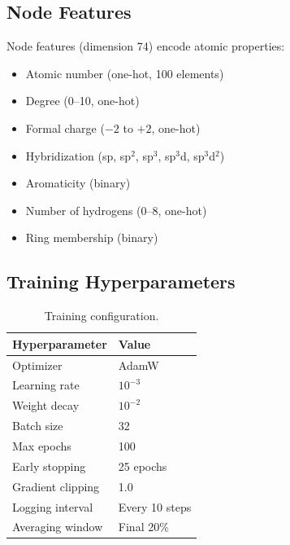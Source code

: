 \documentclass{article}
\begin{document}
\subsection{Node Features}
Node features (dimension 74) encode atomic properties:
\begin{itemize}[nosep,topsep=2pt]
    \item Atomic number (one-hot, 100 elements)
    \item Degree (0--10, one-hot)
    \item Formal charge ($-2$ to $+2$, one-hot)
    \item Hybridization (sp, sp$^2$, sp$^3$, sp$^3$d, sp$^3$d$^2$)
    \item Aromaticity (binary)
    \item Number of hydrogens (0--8, one-hot)
    \item Ring membership (binary)
\end{itemize}
\vspace{-1mm}
\subsection{Training Hyperparameters}
\vspace{-1mm}
\begin{table}[H]
\caption{Training configuration.}
\vspace{-1mm}
\begin{center}
\begin{tabular}{@{}ll@{}}
\toprule
Hyperparameter & Value \\
\midrule
Optimizer & AdamW \\
Learning rate & $10^{-3}$ \\
Weight decay & $10^{-2}$ \\
Batch size & 32 \\
Max epochs & 100 \\
Early stopping & 25 epochs \\
Gradient clipping & 1.0 \\
Logging interval & Every 10 steps \\
Averaging window & Final 20\% \\
\bottomrule
\end{tabular}
\end{center}
\vspace{-2mm}
\end{table}
\vspace{-2mm}
\end{document}
